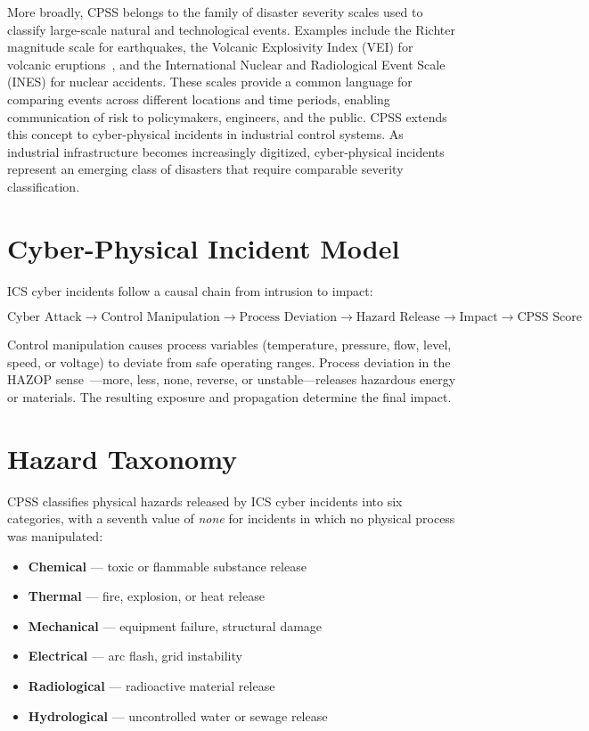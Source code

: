 \documentclass[11pt]{article}
\begin{document}
More broadly, CPSS belongs to the family of disaster severity scales
used to classify large-scale natural and technological events.
Examples include the Richter magnitude scale for earthquakes,
the Volcanic Explosivity Index (VEI) for volcanic eruptions~\cite{vei},
and the International Nuclear and Radiological Event Scale (INES)
for nuclear accidents.
These scales provide a common language for comparing events across
different locations and time periods, enabling communication of risk
to policymakers, engineers, and the public.
CPSS extends this concept to cyber-physical incidents in
industrial control systems.
As industrial infrastructure becomes increasingly digitized,
cyber-physical incidents represent an emerging class of disasters
that require comparable severity classification.

\section{Cyber-Physical Incident Model}

ICS cyber incidents follow a causal chain from intrusion to impact:

\begin{equation*}
\text{Cyber Attack} \to
\text{Control Manipulation} \to
\text{Process Deviation} \to
\text{Hazard Release} \to
\text{Impact} \to
\text{CPSS Score}
\end{equation*}

Control manipulation causes process variables (temperature, pressure,
flow, level, speed, or voltage) to deviate from safe operating ranges.
Process deviation in the HAZOP sense~\cite{hazop}---more, less, none,
reverse, or unstable---releases hazardous energy or materials.
The resulting exposure and propagation determine the final impact.

\section{Hazard Taxonomy}

CPSS classifies physical hazards released by ICS cyber incidents
into six categories, with a seventh value of \emph{none} for
incidents in which no physical process was manipulated:

\begin{itemize}
  \item \textbf{Chemical} --- toxic or flammable substance release
  \item \textbf{Thermal} --- fire, explosion, or heat release
  \item \textbf{Mechanical} --- equipment failure, structural damage
  \item \textbf{Electrical} --- arc flash, grid instability
  \item \textbf{Radiological} --- radioactive material release
  \item \textbf{Hydrological} --- uncontrolled water or sewage release
\end{itemize}
\end{document}
